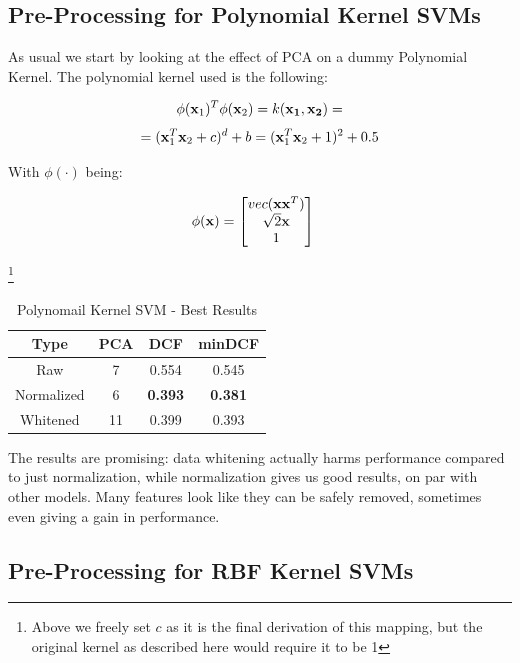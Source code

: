 \documentclass[12pt, twocolumn]{article}
\begin{document}
\subsection{Pre-Processing for Polynomial Kernel SVMs}

As usual we start by looking at the effect of PCA on a dummy Polynomial Kernel. The polynomial kernel used is the following:

$$ \phi({\bf x}_1)^T\phi({\bf x}_2) = k({\bf x_1}, {\bf x_2}) = $$
$$ = ({\bf x}_1^T{\bf x}_2 + c)^d + b = ({\bf x}_1^T{\bf x}_2+1)^2+0.5$$

With $\phi(\cdot)$ being:

\begin{center}
    \begin{align}
        \phi({\bf x}) & = \begin{bmatrix}
                            vec({\bf x}{\bf x}^T) \\
                            \sqrt{2}{\bf x} \\
                            1 \\
                      \end{bmatrix}
    \end{align}
\end{center}
\footnote{Above we freely set $c$ as it is the final derivation of this mapping, but the original kernel as described here would require it to be 1}

\begin{table}[H]
    \centering
        \begin{tabular}{||c|c|c|c||}
            \hline
            Type & PCA & DCF & minDCF \\
            \hline
            \hline
            Raw & 7 & 0.554 &  0.545  \\
            Normalized & 6 & {\bf 0.393} &  {\bf 0.381}  \\
            Whitened & 11 & 0.399 &  0.393  \\
            \hline
    \end{tabular}
    \caption{Polynomail Kernel SVM - Best Results}
\end{table}

The results are promising: data whitening actually harms performance compared to just normalization, while normalization gives us good results, on par with other models.
Many features look like they can be safely removed, sometimes even giving a gain in performance.

\subsection{Pre-Processing for RBF Kernel SVMs}
\end{document}
